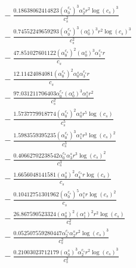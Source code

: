 \documentclass[10pt]{article}
\begin{document}
\begin{align*}
&{}  - \frac{0.18638062414823 \left(\alpha_{0}^{c_s}\right)^{3} \alpha_{2}^s r^{2} \log{\left(c_{s} \right)}^{3}}{c_{s}^{2}} \\
&{}  - \frac{0.74552249659293 \left(\alpha_{0}^{c_s}\right)^{3} \left(\alpha_{0}^s\right)^{3} r^{2} \log{\left(c_{s} \right)}^{3}}{c_{s}^{2}} \\
&{}  - \frac{47.851027601122 \left(\alpha_{0}^{c_s}\right)^{2} \left(\alpha_{0}^s\right)^{3} \alpha_{1}^{c_s} r}{c_{s}} \\
&{}  - \frac{12.11424084081 \left(\alpha_{0}^{c_s}\right)^{2} \alpha_{0}^s \alpha_{3}^{c_s} r}{c_{s}} \\
&{}  - \frac{97.031211706403 \alpha_{0}^{c_s} \left(\alpha_{0}^s\right)^{3} \alpha_{1}^s r^{2}}{c_{s}^{2}} \\
&{}  - \frac{1.5737779918774 \left(\alpha_{0}^{c_s}\right)^{2} \alpha_{0}^s r^{5} \log{\left(c_{s} \right)}}{c_{s}^{5}} \\
&{}  - \frac{1.5983559395235 \left(\alpha_{0}^{c_s}\right)^{3} \alpha_{1}^s r^{3} \log{\left(c_{s} \right)}^{2}}{c_{s}^{3}} \\
&{}  - \frac{0.40662702238542 \alpha_{0}^{c_s} \alpha_{3}^s r^{3} \log{\left(c_{s} \right)}^{2}}{c_{s}^{3}} \\
&{}  - \frac{1.6656048141581 \left(\alpha_{0}^s\right)^{2} \alpha_{4}^{c_s} r \log{\left(c_{s} \right)}}{c_{s}} \\
&{}  - \frac{0.10412751301962 \left(\alpha_{0}^{c_s}\right)^{5} \alpha_{1}^s r \log{\left(c_{s} \right)}^{2}}{c_{s}} \\
&{}  - \frac{26.867590523324 \left(\alpha_{0}^s\right)^{2} \left(\alpha_{1}^s\right)^{2} r^{2} \log{\left(c_{s} \right)}}{c_{s}^{2}} \\
&{}  - \frac{0.052507559280447 \alpha_{2}^{c_s} \alpha_{2}^s r^{2} \log{\left(c_{s} \right)}^{3}}{c_{s}^{2}} \\
&{}  - \frac{0.21003023712179 \left(\alpha_{0}^s\right)^{3} \alpha_{2}^{c_s} r^{2} \log{\left(c_{s} \right)}^{3}}{c_{s}^{2}}
\end{align*}
\end{document}
